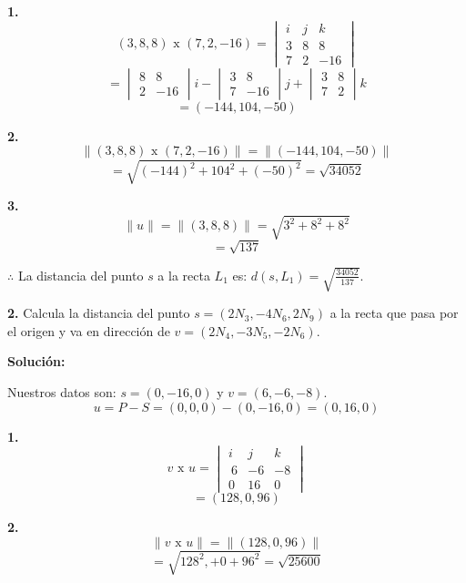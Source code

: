 \documentclass{article}
\begin{document}
\begin{minipage}[c]{0.5cm}
   \textbf{1.}
   $$(3,8,8) \text{ x }(7,2,-16) = \begin{vmatrix}
       i & j & k\\
       3 & 8 & 8 \\
       7 & 2 & -16
   \end{vmatrix}$$
   $$= \begin{vmatrix}
       8 & 8 \\
       2 & -16
   \end{vmatrix}i - \begin{vmatrix}
       3 & 8 \\
       7 & -16
   \end{vmatrix}j+ \begin{vmatrix}
       3 & 8 \\
       7 & 2
   \end{vmatrix}k$$
   $$=(-144, 104, -50)$$
\end{minipage}\hspace*{7cm}\begin{minipage}[c]{0.5cm}
   \textbf{2.}
   $$\|(3,8,8) \text{ x }(7,2,-16)\|= \|(-144,104,-50)\|$$
   $$=\sqrt{(-144)^2+104^2+(-50)^2} = \sqrt{34052}$$
\end{minipage}
\vspace{10pt}


\begin{minipage}[c]{0.5cm}
   \textbf{3.}
   $$\|u\| =\|(3,8, 8)\| = \sqrt{3^2+8^2+8^2}$$
   $$= \sqrt{137}$$
\end{minipage}


$\therefore$ La distancia del punto $s$ a la recta $L_1$ es: $d(s,L_1)= \sqrt{\frac{34052}{137}}$.
\vspace{10pt}


\textbf{2.} Calcula la distancia del punto $s = (2N_3, -4N_6, 2N_9)$ a la recta que pasa por el origen y va en dirección de
$v = (2N_4, -3N_5, -2N_6)$.
\vspace{10pt}


\textbf{Solución:}
\vspace{10pt}


Nuestros datos son: $s = (0, -16, 0)$ y $v = (6, -6, -8)$.
$$u = P-S =(0,0,0)- (0,-16,0) = (0,16,0)$$


\begin{minipage}[c]{0.5cm}
   \textbf{1.}
   $$v \text{ x } u = \begin{vmatrix}
       i & j & k\\\
       6 & -6 & -8 \\
       0 & 16 & 0
   \end{vmatrix}$$
   $$=(128, 0, 96)$$
\end{minipage}\hspace*{7cm}\begin{minipage}[c]{0.5cm}
   \textbf{2.}
   $$\|v \text{ x } u\| = \|(128, 0, 96)\|$$
   $$= \sqrt{128^2, +0 + 96^2} = \sqrt{25600}$$
\end{minipage}
\vspace{10pt}
\end{document}

